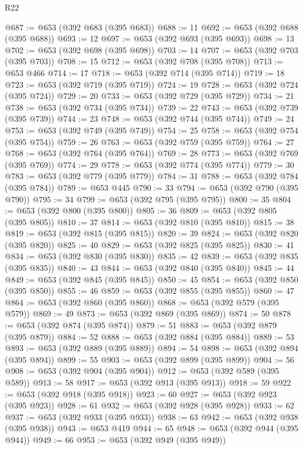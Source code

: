 \begin{lexlean}{R22}
\begin{coremodule}
@687 := @653 (@392 @683 (@395 @683))
@688 := 11
@692 := @653 (@392 @688 (@395 @688))
@693 := 12
@697 := @653 (@392 @693 (@395 @693))
@698 := 13
@702 := @653 (@392 @698 (@395 @698))
@703 := 14
@707 := @653 (@392 @703 (@395 @703))
@708 := 15
@712 := @653 (@392 @708 (@395 @708))
@713 := @653 @466
@714 := 17
@718 := @653 (@392 @714 (@395 @714))
@719 := 18
@723 := @653 (@392 @719 (@395 @719))
@724 := 19
@728 := @653 (@392 @724 (@395 @724))
@729 := 20
@733 := @653 (@392 @729 (@395 @729))
@734 := 21
@738 := @653 (@392 @734 (@395 @734))
@739 := 22
@743 := @653 (@392 @739 (@395 @739))
@744 := 23
@748 := @653 (@392 @744 (@395 @744))
@749 := 24
@753 := @653 (@392 @749 (@395 @749))
@754 := 25
@758 := @653 (@392 @754 (@395 @754))
@759 := 26
@763 := @653 (@392 @759 (@395 @759))
@764 := 27
@768 := @653 (@392 @764 (@395 @764))
@769 := 28
@773 := @653 (@392 @769 (@395 @769))
@774 := 29
@778 := @653 (@392 @774 (@395 @774))
@779 := 30
@783 := @653 (@392 @779 (@395 @779))
@784 := 31
@788 := @653 (@392 @784 (@395 @784))
@789 := @653 @445
@790 := 33
@794 := @653 (@392 @790 (@395 @790))
@795 := 34
@799 := @653 (@392 @795 (@395 @795))
@800 := 35
@804 := @653 (@392 @800 (@395 @800))
@805 := 36
@809 := @653 (@392 @805 (@395 @805))
@810 := 37
@814 := @653 (@392 @810 (@395 @810))
@815 := 38
@819 := @653 (@392 @815 (@395 @815))
@820 := 39
@824 := @653 (@392 @820 (@395 @820))
@825 := 40
@829 := @653 (@392 @825 (@395 @825))
@830 := 41
@834 := @653 (@392 @830 (@395 @830))
@835 := 42
@839 := @653 (@392 @835 (@395 @835))
@840 := 43
@844 := @653 (@392 @840 (@395 @840))
@845 := 44
@849 := @653 (@392 @845 (@395 @845))
@850 := 45
@854 := @653 (@392 @850 (@395 @850))
@855 := 46
@859 := @653 (@392 @855 (@395 @855))
@860 := 47
@864 := @653 (@392 @860 (@395 @860))
@868 := @653 (@392 @579 (@395 @579))
@869 := 49
@873 := @653 (@392 @869 (@395 @869))
@874 := 50
@878 := @653 (@392 @874 (@395 @874))
@879 := 51
@883 := @653 (@392 @879 (@395 @879))
@884 := 52
@888 := @653 (@392 @884 (@395 @884))
@889 := 53
@893 := @653 (@392 @889 (@395 @889))
@894 := 54
@898 := @653 (@392 @894 (@395 @894))
@899 := 55
@903 := @653 (@392 @899 (@395 @899))
@904 := 56
@908 := @653 (@392 @904 (@395 @904))
@912 := @653 (@392 @589 (@395 @589))
@913 := 58
@917 := @653 (@392 @913 (@395 @913))
@918 := 59
@922 := @653 (@392 @918 (@395 @918))
@923 := 60
@927 := @653 (@392 @923 (@395 @923))
@928 := 61
@932 := @653 (@392 @928 (@395 @928))
@933 := 62
@937 := @653 (@392 @933 (@395 @933))
@938 := 63
@942 := @653 (@392 @938 (@395 @938))
@943 := @653 @419
@944 := 65
@948 := @653 (@392 @944 (@395 @944))
@949 := 66
@953 := @653 (@392 @949 (@395 @949))

\end{coremodule}
\end{lexlean}
